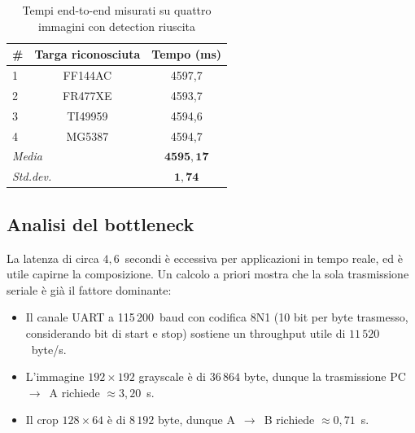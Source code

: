 \begin{table}[H]
    \centering
    
    \begin{tabular}{lcc}
        \toprule
        \textbf{\#} & \textbf{Targa riconosciuta} & \textbf{Tempo (ms)} \\
        \midrule
        1 & FF144AC                   & 4597{,}7 \\
        2 & FR477XE                   & 4593{,}7 \\
        3 & TI49959                   & 4594{,}6 \\
        4 & MG5387                    & 4594{,}7 \\
        \midrule
        \multicolumn{2}{l}{\textit{Media}}   & $\mathbf{4595{,}17}$ \\
        \multicolumn{2}{l}{\textit{Std.dev.}} & $\mathbf{1{,}74}$ \\
        \bottomrule
    \end{tabular}
    \caption{Tempi end-to-end misurati su quattro immagini con detection riuscita}
    \label{tab:tempi}
\end{table}

\subsection{Analisi del bottleneck}
\label{sec:bottleneck}

La latenza di circa $4{,}6$~secondi è eccessiva per applicazioni in tempo reale, ed è utile capirne la composizione. Un calcolo a priori mostra che la sola trasmissione seriale è già il fattore dominante:

\begin{itemize}
    \item Il canale UART a 115\,200~baud con codifica 8N1 (10 bit per byte trasmesso, considerando bit di start e stop) sostiene un throughput utile di $11\,520$~byte/s.
    \item L'immagine $192\times192$ grayscale è di $36\,864$ byte, dunque la trasmissione PC~$\rightarrow$~A richiede $\approx3{,}20$~s.
    \item Il crop $128\times64$ è di $8\,192$ byte, dunque A~$\rightarrow$~B richiede $\approx0{,}71$~s.
\end{itemize}


